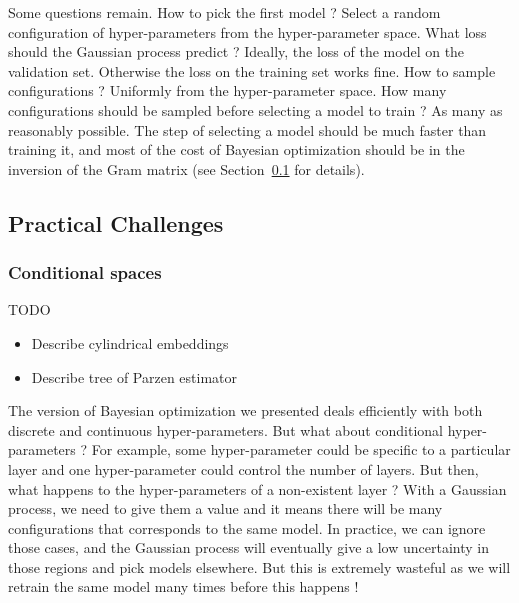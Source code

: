Some questions remain. How to pick the first model ? Select a random configuration of hyper-parameters from the hyper-parameter space. What loss should the Gaussian process predict ? Ideally, the loss of the model on the validation set. Otherwise the loss on the training set works fine. How to sample configurations ? Uniformly from the hyper-parameter space. How many configurations should be sampled before selecting a model to train ? As many as reasonably possible. The step of selecting a model should be much faster than training it, and most of the cost of Bayesian optimization should be in the inversion of the Gram matrix (see Section~\ref{ssec:practical} for details).



\subsection{Practical Challenges}
\label{ssec:practical}


\subsubsection{Conditional spaces}

TODO
\begin{itemize}
    \item Describe cylindrical embeddings
    \item Describe tree of Parzen estimator
\end{itemize}

The version of Bayesian optimization we presented deals efficiently with both discrete and continuous hyper-parameters. But what about conditional hyper-parameters ? For example, some hyper-parameter could be specific to a particular layer and one hyper-parameter could control the number of layers. But then, what happens to the hyper-parameters of a non-existent layer ? With a Gaussian process, we need to give them a value and it means there will be many configurations that corresponds to the same model. In practice, we can ignore those cases, and the Gaussian process will eventually give a low uncertainty in those regions and pick models elsewhere. But this is extremely wasteful as we will retrain the same model many times before this happens ! 

